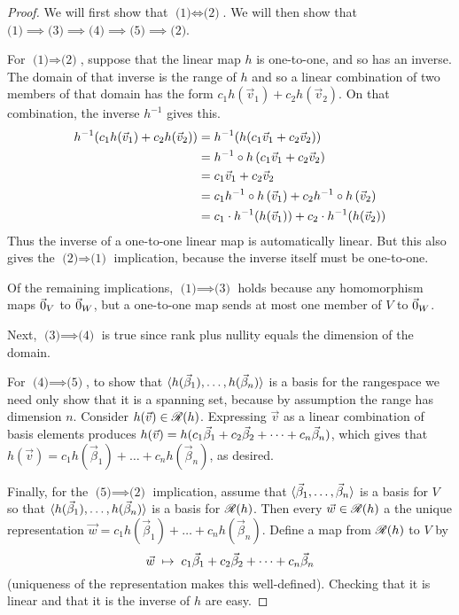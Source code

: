 \begin{proof}
We will first show that \( \text{(1)} \Longleftrightarrow \text{(2)} \).
We will then show that
\(
  \text{(1)}\implies \text{(3)}\implies 
  \text{(4)}\implies \text{(5)}\implies \text{(2)}
\).

For \( \text{(1)} \Longrightarrow \text{(2)} \),
suppose that the linear map $h$ is one-to-one, and so has an inverse.
The domain of that inverse is the range of $h$ and so a linear combination
of  two members of that domain has the form $c_1h(\vec{v}_1)+c_2h(\vec{v}_2)$.
On that combination, the inverse \( h^{-1} \) gives this.
\begin{align*}
  h^{-1}(c_1h(\vec{v}_1)+c_2h(\vec{v}_2))
  &=h^{-1}(h(c_1\vec{v}_1+c_2\vec{v}_2))  \\
  &=h^{-1}\mathbin\circ h\,(c_1\vec{v}_1+c_2\vec{v}_2) \\
  &=c_1\vec{v}_1+c_2\vec{v}_2 \\
  &=c_1h^{-1}\mathbin\circ h\,(\vec{v}_1)
           +c_2h^{-1}\mathbin\circ h\,(\vec{v}_2) \\
  &=c_1\cdot h^{-1}(h(\vec{v}_1))+c_2\cdot h^{-1}(h(\vec{v}_2))
\end{align*}
Thus the inverse of a one-to-one linear map is automatically linear.
But this also gives the \( \text{(2)} \Longrightarrow \text{(1)} \) 
implication, because the inverse itself must be one-to-one.

Of the remaining implications,
\( \text{(1)}\implies \text{(3)} \) holds because any
homomorphism maps \( \vec{0}_V \) to \( \vec{0}_W \), but a one-to-one map sends at
most one member of \( V \) to \( \vec{0}_W \).

Next, \( \text{(3)} \implies \text{(4)} \) is true since rank
plus nullity equals the dimension of the domain.

For
\( \text{(4)} \implies \text{(5)} \), to show that
\( \langle h(\vec{\beta}_1),\dots,h(\vec{\beta}_n)\rangle \)
is a basis for the rangespace we need only show that it is a spanning set,
because by assumption the range has dimension $n$.
Consider $h(\vec{v})\in\mathscr{R}(h)$.
Expressing $\vec{v}$ as a linear combination of basis elements produces
\( h(\vec{v})=h(c_1\vec{\beta}_1+c_2\vec{\beta}_2+\cdots +c_n\vec{\beta}_n) \),
which gives that 
\( h(\vec{v})=c_1h(\vec{\beta}_1)+\dots+c_nh(\vec{\beta}_n) \),
as desired.

Finally, for the \( \text{(5)}\implies \text{(2)} \) implication, assume
that \( \langle\vec{\beta}_1,\dots,\vec{\beta}_n\rangle \)
is a basis for \( V \) so that
\( \langle h(\vec{\beta}_1),\dots,h(\vec{\beta}_n)\rangle \)
is a basis for \( \mathscr{R}(h) \).
Then every
\( \vec{w}\in\mathscr{R}(h) \) a the unique representation
\( \vec{w}=c_1h(\vec{\beta}_1)+\dots+c_nh(\vec{\beta}_n) \).
Define a map from \( \mathscr{R}(h) \) to $V$ by
\begin{equation*}
    \vec{w} \;\mapsto\; c_1\vec{\beta}_1+c_2\vec{\beta}_2+\cdots +c_n\vec{\beta}_n
\end{equation*}
(uniqueness of the representation makes this well-defined).
Checking that it is linear and that
it is the inverse of $h$ are easy.
\end{proof}

